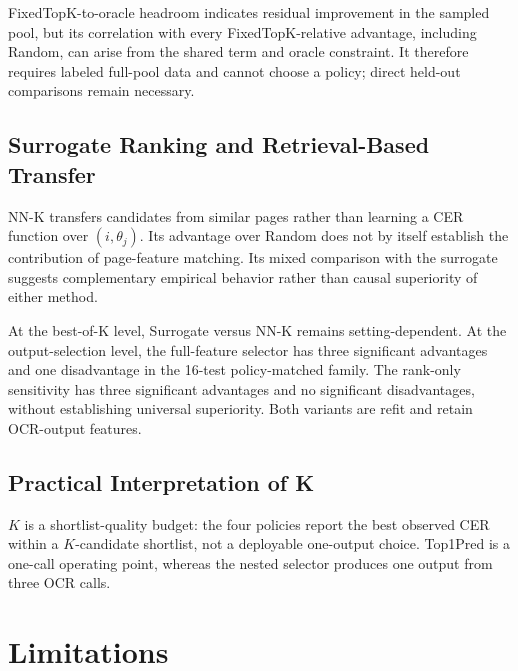 \documentclass[pdflatex,sn-basic,Numbered,iicol]{sn-jnl}
\begin{document}
FixedTopK-to-oracle headroom indicates residual improvement in the sampled pool, but its correlation with every FixedTopK-relative advantage, including Random, can arise from the shared term and oracle constraint. It therefore requires labeled full-pool data and cannot choose a policy; direct held-out comparisons remain necessary.

\subsection{Surrogate Ranking and Retrieval-Based Transfer}

NN-K transfers candidates from similar pages rather than learning a CER function over $(i,\theta_j)$. Its advantage over Random does not by itself establish the contribution of page-feature matching. Its mixed comparison with the surrogate suggests complementary empirical behavior rather than causal superiority of either method.

At the best-of-K level, Surrogate versus NN-K remains setting-dependent. At the output-selection level, the full-feature selector has three significant advantages and one disadvantage in the 16-test policy-matched family. The rank-only sensitivity has three significant advantages and no significant disadvantages, without establishing universal superiority. Both variants are refit and retain OCR-output features.

\subsection{Practical Interpretation of K}

$K$ is a shortlist-quality budget: the four policies report the best observed CER within a $K$-candidate shortlist, not a deployable one-output choice. Top1Pred is a one-call operating point, whereas the nested selector produces one output from three OCR calls.

\section{Limitations}
\label{sec:limitations}
\end{document}
